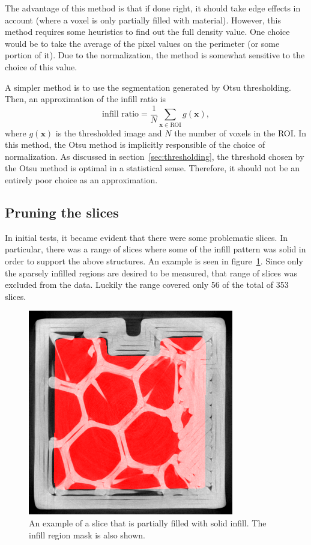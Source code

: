 \documentclass[a4paper,twoside,12pt]{article}
\begin{document}
The advantage of this method is that if done right, it should take edge effects in account (where a voxel is only partially filled with material). However, this method requires some heuristics to find out the full density value. One choice would be to take the average of the pixel values on the perimeter (or some portion of it). Due to the normalization, the method is somewhat sensitive to the choice of this value.

A simpler method is to use the segmentation generated by Otsu thresholding. Then, an approximation of the infill ratio is
\begin{equation}
    \text{infill ratio} = \frac{1}{N} \sum\limits_{\mathbf{x} \in \text{ROI}} g(\mathbf{x}),
\end{equation}
where $g(\mathbf{x})$ is the thresholded image and $N$ the number of voxels in the ROI. In this method, the Otsu method is implicitly responsible of the choice of normalization. As discussed in section~\ref{sec:thresholding}, the threshold chosen by the Otsu method is optimal in a statistical sense. Therefore, it should not be an entirely poor choice as an approximation.

\subsection{Pruning the slices}
In initial tests, it became evident that there were some problematic slices. In particular, there was a range of slices where some of the infill pattern was solid in order to support the above structures. An example is seen in figure~\ref{fig:solid_infill}. Since only the sparsely infilled regions are desired to be measured, that range of slices was excluded from the data. Luckily the range covered only 56 of the total of 353 slices.
\begin{figure}
    \centering
    \includegraphics[width=0.8\textwidth]{images/eroded_71.png}
    \caption{An example of a slice that is partially filled with solid infill. The infill region mask is also shown.}
    \label{fig:solid_infill}
\end{figure}
\end{document}
